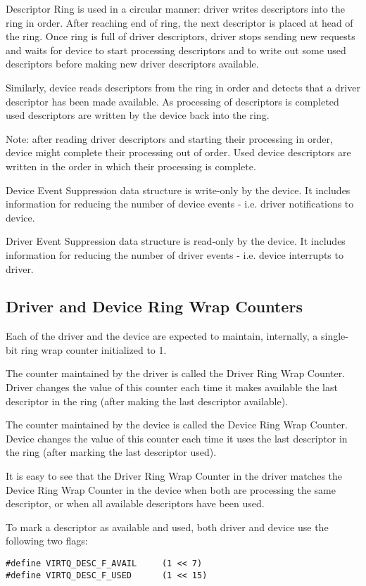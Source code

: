 Descriptor Ring is used in a circular manner: driver writes
descriptors into the ring in order. After reaching end of ring,
the next descriptor is placed at head of the ring.  Once ring is
full of driver descriptors, driver stops sending new requests and
waits for device to start processing descriptors and to write out
some used descriptors before making new driver descriptors
available.

Similarly, device reads descriptors from the ring in order and
detects that a driver descriptor has been made available.  As
processing of descriptors is completed used descriptors are
written by the device back into the ring.

Note: after reading driver descriptors and starting their
processing in order, device might complete their processing out
of order.  Used device descriptors are written in the order
in which their processing is complete.

Device Event Suppression data structure is write-only by the
device. It includes information for reducing the number of
device events - i.e. driver notifications to device.

Driver Event Suppression data structure is read-only by the
device. It includes information for reducing the number of
driver events - i.e. device interrupts to driver.

\subsection{Driver and Device Ring Wrap Counters}
\label{sec:Packed Virtqueues / Driver and Device Ring Wrap Counters}
Each of the driver and the device are expected to maintain,
internally, a single-bit ring wrap counter initialized to 1.

The counter maintained by the driver is called the Driver
Ring Wrap Counter. Driver changes the value of this counter
each time it makes available the
last descriptor in the ring (after making the last descriptor
available).

The counter maintained by the device is called the Device Ring Wrap
Counter.  Device changes the value of this counter
each time it uses the last descriptor in
the ring (after marking the last descriptor used).

It is easy to see that the Driver Ring Wrap Counter in the driver matches
the Device Ring Wrap Counter in the device when both are processing the same
descriptor, or when all available descriptors have been used.

To mark a descriptor as available and used, both driver and
device use the following two flags:
\begin{lstlisting}
#define VIRTQ_DESC_F_AVAIL     (1 << 7)
#define VIRTQ_DESC_F_USED      (1 << 15)
\end{lstlisting}

